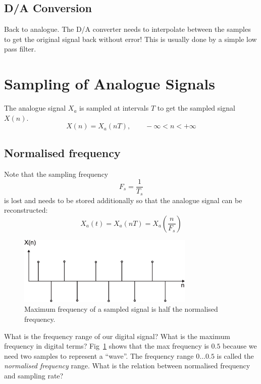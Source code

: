 \documentclass[12pt,a4paper]{article}
\begin{document}
\subsection{D/A Conversion}
Back to analogue. The D/A converter needs to interpolate between the samples
to get the original signal back without error! This is usually
done by a simple low pass filter.




\section{Sampling of Analogue Signals}
The analogue signal $X_a$ is sampled at intervals $T$ to get
the sampled signal $X(n)$.
\begin{equation}
X(n) = X_{a}(nT),  \qquad -\infty < n < +\infty
\end{equation}

\subsection{Normalised frequency}
Note that the sampling frequency
\begin{equation}
F_{s} = \frac{1}{T_s}
\end{equation}
is lost and needs to be stored additionally so that the analogue
signal can be reconstructed:
\begin{equation}
X_{a}(t) = X_{a}(nT) = X_{a}(\frac{n}{F_{s}})
\end{equation}

\begin{figure}[!hbt]
\begin{center}
\mbox{\includegraphics[width=0.75\textwidth]{max_sampl}}
\end{center}
\caption{Maximum frequency of a sampled signal is half the
normalised frequency.
\label{max_sampl}}
\end{figure}


What is the frequency range of our digital signal? What is
the maximum frequency in digital terms? Fig~\ref{max_sampl} shows that the
max frequency is $0.5$ because we need two samples to
represent a ``wave''. The frequency range $0\ldots 0.5$
is called the \textsl{normalised frequency} range. What is the relation
between normalised frequency and sampling rate?
\end{document}

